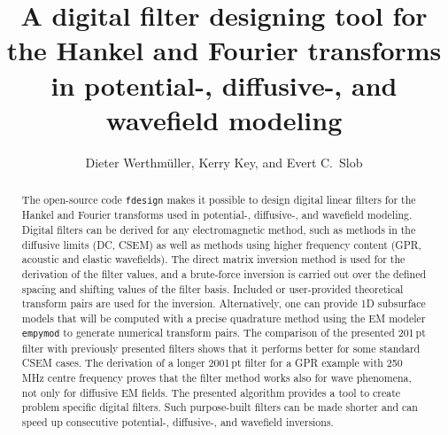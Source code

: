 \documentclass[paper,twocolumn,twoside]{geophysics}
\begin{document}
\title{A digital filter designing tool for the Hankel and Fourier transforms in
potential-, diffusive-, and wavefield modeling}

\renewcommand{\thefootnote}{\fnsymbol{footnote}}


\address{
\footnotemark[1]Instituto Mexicano del Petróleo,
Eje Central Lázaro Cárdenas Norte 152,
Col. San Bartolo Atepehuacan C.P. 07730,
Ciudad de México, México,
E-mail: \href{mailto:dieter@werthmuller.org}{Dieter@Werthmuller.org};
\footnotemark[2]Lamont-Doherty Earth Observatory,
305C Oceanography,
61 Route 9W, PO Box 1000,
Palisades NY 10964-8000 US,
E-mail: \href{mailto:KKey@ldeo.columbia.edu}{KKey@ldeo.columbia.edu};
\footnotemark[3]TU Delft,
Building 23,
Stevinweg 1 / PO-box 5048,
2628 CN Delft,
E-mail: \href{mailto:E.C.Slob@tudelft.nl}{E.C.Slob@tudelft.nl}.}


\author{%
Dieter Werthmüller\footnotemark[1], %
Kerry Key\footnotemark[2], and %
Evert C.\ Slob\footnotemark[3]%
}

\footer{}

\maketitle

\begin{abstract} %
%
  The open-source code \texttt{fdesign} makes it possible to design digital
  linear filters for the Hankel and Fourier transforms used in potential-,
  diffusive-, and wavefield modeling. Digital filters can be derived for any
  electromagnetic method, such as methods in the diffusive limits (DC, CSEM) as
  well as methods using higher frequency content (GPR, acoustic and elastic
  wavefields).
%
  The direct matrix inversion method is used for the derivation of the filter
  values, and a brute-force inversion is carried out over the defined spacing
  and shifting values of the filter basis. Included or user-provided
  theoretical transform pairs are used for the inversion. Alternatively, one
  can provide 1D subsurface models that will be computed with a precise
  quadrature method using the EM modeler \texttt{empymod} to generate
  numerical transform pairs.
%
  The comparison of the presented 201\,pt filter with previously presented
  filters shows that it performs better for some standard CSEM cases. The
  derivation of a longer 2001\,pt filter for a GPR example with 250\,MHz centre
  frequency proves that the filter method works also for wave phenomena, not
  only for diffusive EM fields.
%
  The presented algorithm provides a tool to create problem specific digital
  filters. Such purpose-built filters can be made shorter and can speed up
  consecutive  potential-, diffusive-, and wavefield inversions.
%
\end{abstract}
\end{document}
